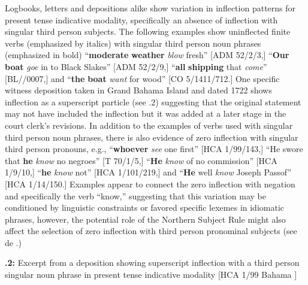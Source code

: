   Logbooks, letters and depositions alike show variation in inflection patterns for present tense indicative modality, specifically an absence of inflection with singular third person subjects. The following examples show uninflected finite verbs (emphasized by italics) with singular third person noun phrases (emphasized in bold) “\textbf{moderate} \textbf{weather} \textit{blow} fresh” [ADM 52/2/3,] “\textbf{Our} \textbf{boat} \textit{goe} in to Black Slakes” [ADM 52/2/9,] “\textbf{all} \textbf{shipping} that \textit{come}” [BL/\citealt{Egerton2395}/0007,] and “\textbf{the} \textbf{boat} \textit{want} for wood” [CO 5/1411/712.] One specific witness deposition taken in Grand Bahama Island and dated 1722 shows inflection as a superscript particle (see .2) suggesting that the original statement may not have included the inflection but it was added at a later stage in the court clerk’s revisions. In addition to the examples of verbs used with singular third person noun phrases, there is also evidence of zero inflection with singular third person pronouns, e.g., “\textbf{whoever} \textit{see} one first” [HCA 1/99/143,] “He swore that \textbf{he} \textit{know} no negroes” [T 70/1/5,] “\textbf{He} \textit{know} of no commission” [HCA 1/9/10,] “\textbf{he} \textit{know} not” [HCA 1/101/219,] and “\textbf{He} well \textit{know} Joseph Passof” [HCA 1/14/150.] Examples appear to connect the zero inflection with negation and specifically the verb “know,” suggesting that this variation may be conditioned by linguistic constraints or favored specific lexemes in idiomatic phrases, however, the potential role of the Northern Subject Rule might also affect the selection of zero inflection with third person pronominal subjects (see de \citealt{Haas2006}.) 

 

\textbf{.2:} Excerpt from a deposition showing superscript inflection with a third person singular noun phrase in present tense indicative modality [HCA 1/99 Bahama \citealt{Islands1722}]

